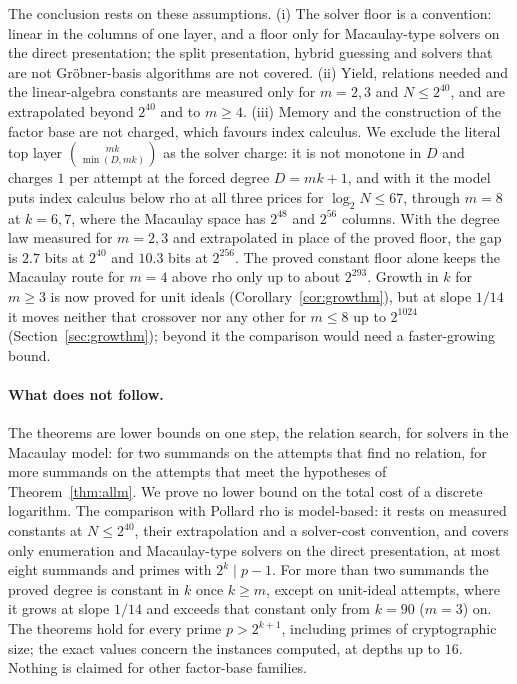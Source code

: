 \documentclass[11pt]{article}
\theoremstyle{definition}\newtheorem{definition}[theorem]{Definition}
\theoremstyle{remark}\newtheorem{remark}[theorem]{Remark}
\begin{document}
The conclusion rests on these assumptions. (i) The solver floor is a
convention: linear in the columns of one layer, and a floor only for
Macaulay-type solvers on the direct presentation; the split presentation,
hybrid guessing and solvers that are not Gr\"obner-basis algorithms are not
covered. (ii) Yield, relations needed and the linear-algebra constants are
measured only for $m=2,3$ and $N\le2^{40}$, and are extrapolated beyond
$2^{40}$ and to $m\ge4$. (iii) Memory and the construction of the factor base
are not charged, which favours index calculus. We exclude the literal top
layer $\binom{mk}{\min(D,mk)}$ as the solver charge: it is not monotone in
$D$ and charges $1$ per attempt at the forced degree $D=mk+1$, and with it
the model puts index calculus below rho at all three prices for
$\log_2N\le67$, through $m=8$ at $k=6,7$, where the Macaulay space has
$2^{48}$ and $2^{56}$ columns. With the degree law measured for $m=2,3$ and
extrapolated in place of the proved floor, the gap is $2.7$ bits at $2^{40}$
and $10.3$ bits at $2^{256}$. The proved constant floor alone keeps the
Macaulay route for $m=4$ above rho only up to about $2^{293}$. Growth in
$k$ for $m\ge3$ is now proved for unit ideals (Corollary~\ref{cor:growthm}),
but at slope $1/14$ it moves neither that crossover nor any other for
$m\le8$ up to $2^{1024}$ (Section~\ref{sec:growthm}); beyond it the
comparison would need a faster-growing bound.

\paragraph{What does not follow.} The theorems are lower bounds on one
step, the relation search, for solvers in the Macaulay model: for two
summands on the attempts that find no relation, for more summands on the
attempts that meet the hypotheses of Theorem~\ref{thm:allm}. We prove no
lower bound on the total cost of a discrete logarithm. The comparison with
Pollard rho is model-based: it rests on measured constants at
$N\le2^{40}$, their extrapolation and a solver-cost convention, and covers
only enumeration and Macaulay-type solvers on the direct presentation, at
most eight summands and primes with $2^k\mid p-1$. For more than two
summands the proved degree is constant in $k$ once $k\ge m$, except on
unit-ideal attempts, where it grows at slope $1/14$ and exceeds that
constant only from $k=90$ ($m=3$) on. The theorems hold for
every prime $p>2^{k+1}$, including primes of cryptographic size; the exact
values concern the instances computed, at depths up to $16$. Nothing is
claimed for other factor-base families.
\end{document}
